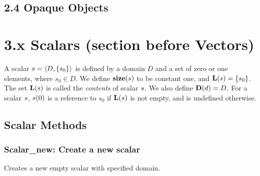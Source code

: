 \vfill
\pagebreak


\subsection*{2.4 Opaque Objects}



\section*{3.x Scalars (section before Vectors)}
\label{Sec:Scalars}


A scalar ${s} = \langle D, \{ s_0 \} \rangle$ is defined by a domain $D$ and 
a set of zero or one elements, where $s_0 \in D$. We define $\mathbf{size}({s})$ 
to be constant one, and
$\mathbf{L}({s}) = \{ s_0 \}$. The set $\mathbf{L}({s})$ is
called the \emph{contents} of scalar ${s}$. We also define $\mathbf{D}({d})
= D$. For a scalar ${s}$, ${s}(0)$ is a reference to $s_0$
if $\mathbf{L}({s})$ is not empty, and is undefined otherwise.


\subsection{Scalar Methods}


\subsubsection{{\sf Scalar\_new}: Create a new scalar}

Creates a new empty scalar with specified domain.

